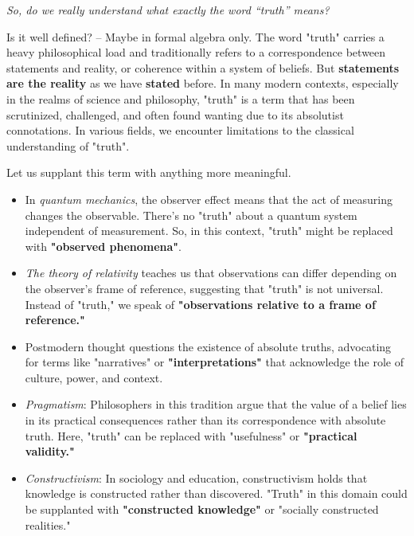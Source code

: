 \documentclass[11pt,a4]{article}
\begin{document}
\par
\textit{So, do we really understand what exactly the word “truth” means?} \\
\par
Is it well defined? -- Maybe in formal algebra only. The word "truth" carries a heavy philosophical load and traditionally refers to a correspondence between statements and reality, or coherence within a system of beliefs. But \textbf{statements are the reality} as we have \textbf{stated} before.
In many modern contexts, especially in the realms of science and philosophy, "truth" is a term that has been scrutinized, challenged, and often found wanting due to its absolutist connotations.
In various fields, we encounter limitations to the classical understanding of "truth".


Let us supplant this term with anything more meaningful.

\begin{itemize}

    \item In \textit{quantum mechanics}, the observer effect means that the act of measuring changes the observable. There's no "truth" about a quantum system independent of measurement. So, in this context, "truth" might be replaced with \textbf{"observed phenomena"}.
    \item \textit{The theory of relativity} teaches us that observations can differ depending on the observer's frame of reference, suggesting that "truth" is not universal. Instead of "truth," we speak of \textbf{"observations relative to a frame of reference."}
    \item Postmodern thought questions the existence of absolute truths, advocating for terms like "narratives" or \textbf{"interpretations"} that acknowledge the role of culture, power, and context.
    \item \textit{Pragmatism}: Philosophers in this tradition argue that the value of a belief lies in its practical consequences rather than its correspondence with absolute truth. Here, "truth" can be replaced with "usefulness" or \textbf{"practical validity."}
    \item \textit{Constructivism}: In sociology and education, constructivism holds that knowledge is constructed rather than discovered. "Truth" in this domain could be supplanted with \textbf{"constructed knowledge"} or "socially constructed realities."
\end{itemize}
\end{document}
